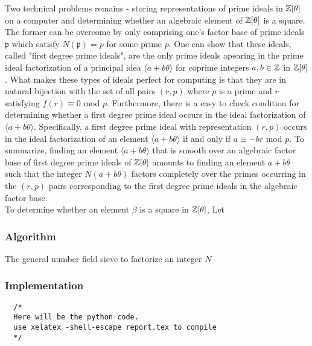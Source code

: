     Two technical problems remains - storing representations of prime ideals in $\mathbb{Z}[\theta]$ on a computer and determining whether an algebraic element of $\mathbb{Z}[\theta]$ is a square. \\ 

    The former can be overcome by only comprising one's factor base of prime ideals $\mathfrak{p}$ which satisfy $N(\mathfrak{p})=p$ for some prime $p$. One can show that these ideals, called "first degree prime ideals", are the only prime ideals apearing in the prime ideal factorization of a principal idea $\langle a + b \theta \rangle $ for coprime integers $a,b\in \mathbb{Z}$ in $\mathbb{Z}[\theta]$. What makes these types of ideals perfect for computing is that they are in natural bijection with the set of all pairs $(r,p)$ where $p$ is a prime and $r$ satisfying $f(r) \equiv 0$ mod $p$. Furthermore, there is a easy to check condition for determining whether a first degree prime ideal occurs in the ideal factorization of $\langle a + b \theta \rangle $. Specifically, a first degree prime ideal with representation $(r,p)$ occurs in the ideal factorization of an element $\langle a + b \theta \rangle $ if and only if $a \equiv -br $ mod $p$. To summarize, finding an element $\langle a + b \theta \rangle $ that is smooth over an algebraic factor base of first degree prime ideals of $\mathbb{Z}[\theta]$ amounts to finding an element $a + b \theta $ such that the integer $N(a + b \theta)$ factors completely over the primes occurring in the $(r,p)$ pairs corresponding to the first degree prime ideals in the algebraic factor base. \\

    To determine whether an element $\beta$ is a square in $\mathbb{Z}[\theta]$, Let 


\subsubsection{Algorithm} \label{algo}

 
\begin{algorithm} 
  \caption{The general number field sieve to factorize an integer $N$}
  \begin{algorithmic}[1]
    \State {}
  \end{algorithmic} 
\end{algorithm} 

\subsubsection{Implementation}


\begin{verbatim}
  /*
  Here will be the python code.
  use xelatex -shell-escape report.tex to compile 
  */

\end{verbatim}



